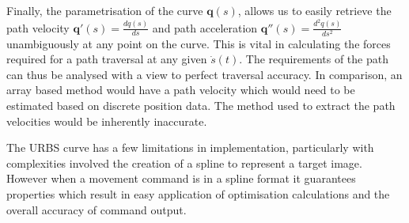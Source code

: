 Finally, the parametrisation of the curve $\textbf{q}(s)$, allows us to easily retrieve the path velocity $\textbf{q}'(s) = \frac{dq(s)}{ds}$ and path acceleration $\textbf{q}''(s) =  \frac{d^2q(s)}{ds^2}$ unambiguously at any point on the curve. This is vital in calculating the forces required for a path traversal at any given $\dot{s}(t)$. The requirements of the path can thus be analysed with a view to perfect traversal accuracy. In comparison, an array based method would have a path velocity which would need to be estimated based on discrete position data. The method used to extract the path velocities would be inherently inaccurate.

The URBS curve has a few limitations in implementation, particularly with complexities involved the creation of a spline to represent a target image. However when a movement command is in a spline format it guarantees properties which result in easy application of optimisation calculations and the overall accuracy of command output.